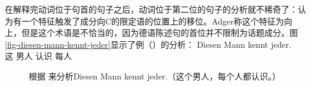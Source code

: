 在解释完动词位于句首的句子之后，动词位于第二位的句子的分析就不稀奇了：\citet[]{Adger2003a}认为有一个特征触发了成分向C的限定语的位置上的移位。Adger称这个特征为向上，但是这个术语是不恰当的，因为德语陈述句的首位并不限制为话题成分。图\vref{fig-diesen-mann-kennt-jeder}显示了例（）的分析：
\ea
\gll Diesen Mann kennt jeder.\\
     这 男人    认识 每人\\
\z
\begin{figure}
\caption{\label{fig-diesen-mann-kennt-jeder}根据 \citet[]{Adger2003a}来分析Diesen Mann kennt jeder.（这个男人，每个人都认识。）}
\end{figure}%

